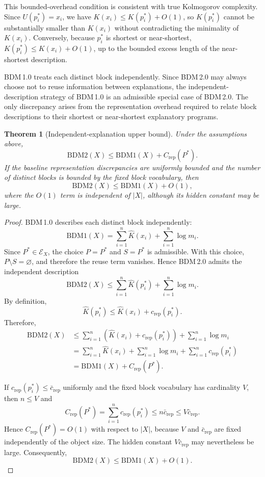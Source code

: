 \documentclass{article}
\newtheorem{theorem}{Theorem}
\begin{document}
This bounded-overhead condition is consistent with true Kolmogorov complexity. Since \(U(p_i^*)=x_i\), we have \(K(x_i)\leq K(p_i^*)+O(1)\), so \(K(p_i^*)\) cannot be substantially smaller than \(K(x_i)\) without contradicting the minimality of \(K(x_i)\). Conversely, because \(p_i^*\) is shortest or near-shortest, \(K(p_i^*)\leq K(x_i)+O(1)\), up to the bounded excess length of the near-shortest description.

BDM\,1.0 treats each distinct block independently. Since BDM\,2.0 may always choose not to reuse information between explanations, the independent-description strategy of BDM\,1.0 is an admissible special case of BDM\,2.0. The only discrepancy arises from the representation overhead required to relate block descriptions to their shortest or near-shortest explanatory programs.

\begin{theorem}[Independent-explanation upper bound]
\label{thm:bdm2-independent-limit}
Under the assumptions above,
\[
\mathrm{BDM2}(X)
\leq
\mathrm{BDM1}(X)
+
C_{\mathrm{rep}}(P^*).
\]
If the baseline representation discrepancies are uniformly bounded and the number of distinct blocks is bounded by the fixed block vocabulary, then
\[
\mathrm{BDM2}(X)
\leq
\mathrm{BDM1}(X)
+
O(1),
\]
where the \(O(1)\) term is independent of \(|X|\), although its hidden constant may be large.
\end{theorem}

\begin{proof}
BDM\,1.0 describes each distinct block independently:
\[
\mathrm{BDM1}(X)
=
\sum_{i=1}^{n}\hat K(x_i)
+
\sum_{i=1}^{n}\log m_i.
\]
Since \(P^*\in\mathcal E_X\), the choice \(P=P^*\) and \(S=P^*\) is admissible. With this choice, \(P\setminus S=\varnothing\), and therefore the reuse term vanishes. Hence BDM\,2.0 admits the independent description
\begin{equation}
\label{eq:bdm2-independent-bound}
\mathrm{BDM2}(X)
\leq
\sum_{i=1}^{n}\hat K(p_i^*)
+
\sum_{i=1}^{n}\log m_i.
\end{equation}
By definition,
\[
\hat K(p_i^*)
\leq
\hat K(x_i)
+
c_{\mathrm{rep}}(p_i^*).
\]
Therefore,
\[
\begin{aligned}
\mathrm{BDM2}(X)
&\leq
\sum_{i=1}^{n}
\left(
\hat K(x_i)+c_{\mathrm{rep}}(p_i^*)
\right)
+
\sum_{i=1}^{n}\log m_i \\
&=
\sum_{i=1}^{n}\hat K(x_i)
+
\sum_{i=1}^{n}\log m_i
+
\sum_{i=1}^{n}c_{\mathrm{rep}}(p_i^*) \\
&=
\mathrm{BDM1}(X)
+
C_{\mathrm{rep}}(P^*).
\end{aligned}
\]

If \(c_{\mathrm{rep}}(p_i^*)\leq\bar c_\mathrm{rep}\) uniformly and the fixed block vocabulary has cardinality \(V\), then \(n\leq V\) and
\[
C_{\mathrm{rep}}(P^*)
=
\sum_{i=1}^{n}c_{\mathrm{rep}}(p_i^*)
\leq
n\bar c_\mathrm{rep}
\leq
V\bar c_\mathrm{rep}.
\]
Hence \(C_{\mathrm{rep}}(P^*)=O(1)\) with respect to \(|X|\), because \(V\) and \(\bar c_\mathrm{rep}\) are fixed independently of the object size. The hidden constant \(V\bar c_\mathrm{rep}\) may nevertheless be large. Consequently,
\[
\mathrm{BDM2}(X)
\leq
\mathrm{BDM1}(X)
+
O(1).
\]
\end{proof}
\end{document}
